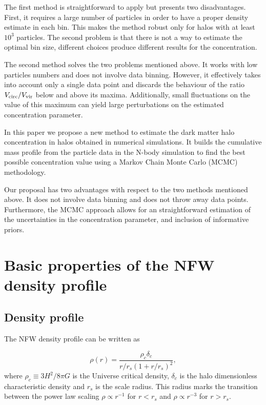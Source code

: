 \documentclass{emulateapj}
\begin{document}
The first method is straightforward to apply but presents two
disadvantages.
First, it requires a large number of particles in
order to have a proper density estimate in each bin.
This makes the method robust only for halos with at least  $10^3$
particles.
The second problem is that there is not a way to estimate the optimal
bin size, different choices produce different results for the
concentration.

The second method solves the two problems mentioned above.
It works with low particles numbers and does not involve data
binning.
However, it effectively takes into account only a single data point
and discards the behaviour of the ratio $V_{\rm circ}/V_{\rm vir}$ below and
above its maxima.
Additionally, small fluctuations on the value of this maximum can
yield large perturbations on the estimated concentration parameter.

In this paper we propose a new method to estimate the dark matter halo
concentration in halos obtained in numerical simulations.
It builds the cumulative mass profile from the particle data in the
N-body simulation to find the best possible concentration value using
a Markov Chain Monte Carlo (MCMC) methodology.


Our proposal has two advantages with respect to the two methods mentioned
above. 
It does not involve data binning and does not throw away data points.
Furthermore, the MCMC approach allows for an straightforward
estimation of the uncertainties in the concentration parameter, and
inclusion of informative priors.




\section{Basic properties of the NFW density profile}
\label{sec:basics}


\subsection{Density profile}

The NFW density profile can be written as

\begin{equation}
\rho(r) = \frac{\rho_c\delta_c}{r/r_s(1+r/r_s)^2},
\label{eq:definition}
\end{equation}
%
where $\rho_c\equiv 3H^2/8\pi G$ is the Universe critical density,
$\delta_c$ is the halo dimensionless characteristic density and $r_s$
is the scale radius. This radius marks the transition
between the power law scaling $\rho\propto r^{-1}$ for
$r<r_s$ and $\rho\propto r^{-3}$ for  $r>r_s$.
\end{document}
